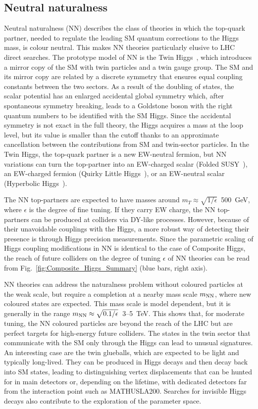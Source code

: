 \documentclass[../report.tex]{subfiles}
\begin{document}
\subsection{Neutral naturalness}
Neutral naturalness (NN) describes the class of theories in which the top-quark partner, needed to regulate the leading SM quantum corrections to the Higgs mass, is colour neutral. This makes NN theories particularly elusive to LHC direct searches. The prototype model of NN is the Twin Higgs~\cite{Chacko:2005pe}, which introduces a mirror copy of the SM with twin particles and a twin gauge group. The SM and its mirror copy are related by a discrete symmetry that ensures equal coupling constants between the two sectors. As a result of the doubling of states, the scalar potential has an enlarged accidental global symmetry which, after spontaneous symmetry breaking, leads to a Goldstone boson with the right quantum numbers to be identified with the SM Higgs. Since the accidental symmetry is not exact in the full theory, the Higgs acquires a mass at the loop level, but its value is smaller than the cutoff thanks to an approximate cancellation between the contributions from SM and twin-sector particles. In the Twin Higgs, the top-quark partner is a new EW-neutral fermion, but NN variations can turn the top-partner into an EW-charged scalar (Folded SUSY~\cite{Burdman:2006tz}), an EW-charged fermion (Quirky Little Higgs~\cite{Cai:2008au}), or an EW-neutral scalar (Hyperbolic Higgs~\cite{Cohen:2018mgv,Cheng:2018gvu}). 

The NN top-partners are expected to have masses around $m_T \approx \sqrt{1/\epsilon}$~500~GeV, where $\epsilon$ is the degree of fine tuning. If they carry EW charge, the NN top-partners can be produced at colliders via DY-like processes. However, because of their unavoidable couplings with the Higgs, a more robust way of detecting their presence is through Higgs precision measurements. Since the parametric scaling of Higgs coupling modifications in NN is identical to the case of Composite Higgs, the reach of future colliders on the degree of tuning $\epsilon$ of NN theories can be read from Fig.~\ref{fig:Composite_Higgs_Summary} (blue bars, right axis).

NN theories can address the naturalness problem without coloured particles at the weak scale, but require a completion at a nearby mass scale $m_{\rm NN}$, where new coloured states are expected. This mass scale is model dependent, but it is generally in the range $m_{\rm NN}\approx \sqrt{0.1/\epsilon}$~3--5~TeV. This shows that, for moderate tuning, the NN coloured particles are beyond the reach of the LHC but are perfect targets for high-energy future colliders. 
The states in the twin sector that communicate with the SM only through the Higgs can lead to unusual signatures. An interesting case are the twin glueballs, which are expected to be light and typically long-lived. They can be produced in Higgs decays and then decay back into SM states, leading to distinguishing vertex displacements that can be hunted for in main detectors or, depending on the lifetime, with dedicated detectors far from the interaction point such as MATHUSLA200. Searches for invisible Higgs decays also contribute to the exploration of the parameter space.
\end{document}
